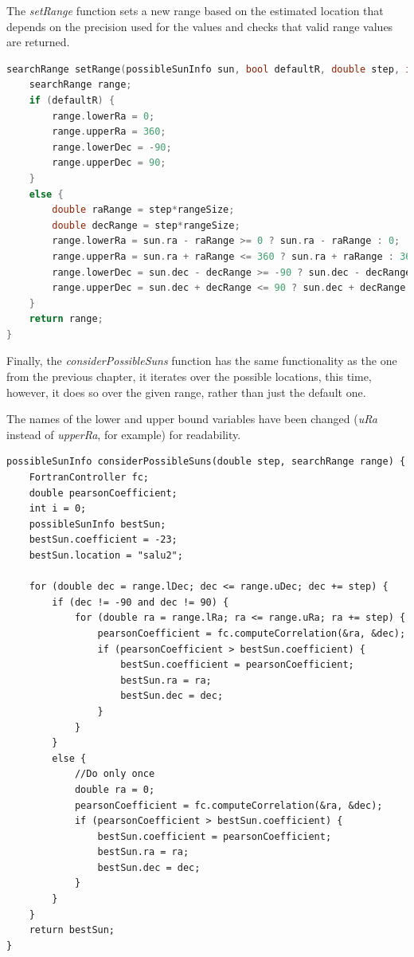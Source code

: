 The \textit{setRange} function sets a new range based on the estimated location that depends on the precision used for the values and checks that valid range values are returned.

\begin{minipage}{\linewidth}
	\begin{lstlisting}[language=c, caption=Setting the new range based on the estimated source location]
searchRange setRange(possibleSunInfo sun, bool defaultR, double step, int rangeSize) {
	searchRange range;
	if (defaultR) {
		range.lowerRa = 0;
		range.upperRa = 360;
		range.lowerDec = -90;
		range.upperDec = 90;
	}
	else {
		double raRange = step*rangeSize;
		double decRange = step*rangeSize;
		range.lowerRa = sun.ra - raRange >= 0 ? sun.ra - raRange : 0;
		range.upperRa = sun.ra + raRange <= 360 ? sun.ra + raRange : 360;
		range.lowerDec = sun.dec - decRange >= -90 ? sun.dec - decRange : -90;
		range.upperDec = sun.dec + decRange <= 90 ? sun.dec + decRange : 90;
	}
	return range;
}\end{lstlisting}
\end{minipage}

Finally, the \textit{considerPossibleSuns} function has the same functionality as the one from the previous chapter, it iterates over the possible locations, this time, however, it does so over the given range, rather than just the default one.

The names of the lower and upper bound variables have been changed (\textit{uRa} instead of \textit{upperRa}, for example) for readability.

\begin{minipage}{\linewidth}
	\begin{lstlisting}[style=myCStyle, caption=Iterating over possible locations within the given range]
possibleSunInfo considerPossibleSuns(double step, searchRange range) {
	FortranController fc;
	double pearsonCoefficient;
	int i = 0;
	possibleSunInfo bestSun;
	bestSun.coefficient = -23;
	bestSun.location = "salu2";

	for (double dec = range.lDec; dec <= range.uDec; dec += step) {
		if (dec != -90 and dec != 90) {
			for (double ra = range.lRa; ra <= range.uRa; ra += step) {
				pearsonCoefficient = fc.computeCorrelation(&ra, &dec);
				if (pearsonCoefficient > bestSun.coefficient) {
					bestSun.coefficient = pearsonCoefficient;
					bestSun.ra = ra;
					bestSun.dec = dec;
				}
			}
		}
		else {
			//Do only once
			double ra = 0;
			pearsonCoefficient = fc.computeCorrelation(&ra, &dec);
			if (pearsonCoefficient > bestSun.coefficient) {
				bestSun.coefficient = pearsonCoefficient;
				bestSun.ra = ra;
				bestSun.dec = dec;
			}
		}
	}
	return bestSun;
}\end{lstlisting}
\end{minipage}

